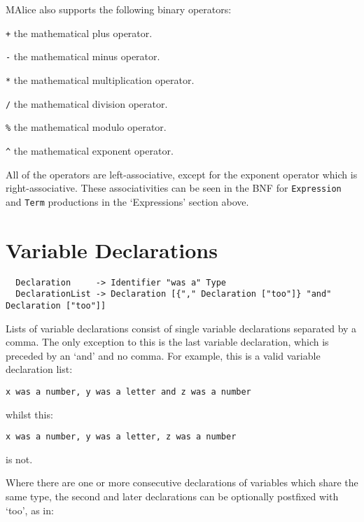 \documentclass[a4wide, 11pt]{article}
\begin{document}
MAlice also supports the following binary operators:

\begin{list}{} {
\setlength{\labelsep}{0.75cm}
\setlength{\leftmargin}{2cm}
}

\item[\texttt{+}] the mathematical plus operator.
\item[\texttt{-}] the mathematical minus operator.
\item[\texttt{*}] the mathematical multiplication operator.
\item[\texttt{/}] the mathematical division operator.
\item[\texttt{\%}] the mathematical modulo operator.
\item[\texttt{\^}] the mathematical exponent operator.

\end{list}

All of the operators are left-associative, except for the exponent operator which is right-associative. These associativities can be seen in the BNF for \texttt{Expression} and \texttt{Term} productions in the `Expressions' section above.

\section{Variable Declarations}

\begin{verbatim}
  Declaration     -> Identifier "was a" Type
  DeclarationList -> Declaration [{"," Declaration ["too"]} "and" Declaration ["too"]]
\end{verbatim}

Lists of variable declarations consist of single variable declarations separated by a comma. The only exception to this is the last variable declaration, which is preceded by an `and' and no comma. For example, this is a valid variable declaration list:

\begin{verbatim}
x was a number, y was a letter and z was a number
\end{verbatim}

whilst this:

\begin{verbatim}
x was a number, y was a letter, z was a number
\end{verbatim}

is not.

Where there are one or more consecutive declarations of variables which share the same type, the second and later declarations can be optionally postfixed with `too', as in:
\end{document}
